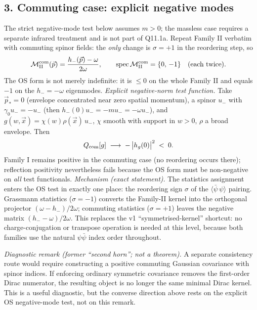 \subsection*{3. Commuting case: explicit negative modes}
The strict negative-mode test below assumes $m>0$; the massless
case requires a separate infrared treatment and is not part of
Q11.1a.
Repeat Family II verbatim with commuting spinor fields:
the \emph{only} change is $\sigma=+1$ in the reordering step, so
\[
\mathcal M_{\rm II}^{\rm com}(\vec p)
=\frac{h_-(\vec p)-\omega}{2\omega},
\qquad
\mathrm{spec}\,\mathcal M_{\rm II}^{\rm com}=\{0,\,-1\}
\quad\text{(each twice)} .
\]
The OS form is not merely indefinite: it is $\le0$ on the whole
Family II and equals $-1$ on the $h_-=-\omega$ eigenmodes.
\emph{Explicit negative-norm test function.}
Take $\vec p_\ast=0$ (envelope concentrated near zero spatial
momentum), a spinor $u_-$ with $\gamma_0u_-=-u_-$ (then
$h_-(0)u_-=-mu_-=-\omega u_-$), and
$g(w,\vec x)=\chi(w)\rho(\vec x)\,u_-$, $\chi$ smooth with support
in $w>0$, $\rho$ a broad envelope.
Then
\[
Q_{\rm com}[g]\;\longrightarrow\;
-\,\bigl|h_g(0)\bigr|^2\;<\;0 .
\]
Family I remains positive in the commuting case (no reordering
occurs there); reflection positivity nevertheless fails because the
OS form must be non-negative on \emph{all} test functionals.
\emph{Mechanism (exact statement).}
The statistics assignment enters the OS test in exactly one place:
the reordering sign $\sigma$ of the
$\langle\bar\psi\,\psi\rangle$ pairing.
Grassmann statistics ($\sigma=-1$) converts the Family-II kernel
into the orthogonal projector $(\omega-h_-)/2\omega$; commuting
statistics ($\sigma=+1$) leaves the negative matrix
$(h_--\omega)/2\omega$.
This replaces the v1 ``symmetrised-kernel'' shortcut: no
charge-conjugation or transpose operation is needed at this level,
because both families use the natural $\psi\bar\psi$ index order
throughout.

\emph{Diagnostic remark (former ``second horn''; not a theorem).}
A separate consistency route would require constructing a positive
commuting Gaussian covariance with spinor indices.
If enforcing ordinary symmetric covariance removes the first-order
Dirac numerator, the resulting object is no longer the same minimal
Dirac kernel.
This is a useful diagnostic, but the converse direction above rests
on the explicit OS negative-mode test, not on this remark.

